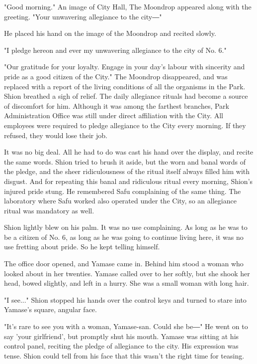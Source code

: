 "Good morning." An image of City Hall, The Moondrop appeared along with
the greeting. "Your unwavering allegiance to the city―"

He placed his hand on the image of the Moondrop and recited slowly.

"I pledge hereon and ever my unwavering allegiance to the city of No.
6."

"Our gratitude for your loyalty. Engage in your day's labour with
sincerity and pride as a good citizen of the City." The Moondrop
disappeared, and was replaced with a report of the living conditions of
all the organisms in the Park. Shion breathed a sigh of relief. The
daily allegiance rituals had become a source of discomfort for him.
Although it was among the farthest branches, Park Administration Office
was still under direct affiliation with the City. All employees were
required to pledge allegiance to the City every morning. If they
refused, they would lose their job.

It was no big deal. All he had to do was cast his hand over the display,
and recite the same words. Shion tried to brush it aside, but the worn
and banal words of the pledge, and the sheer ridiculousness of the
ritual itself always filled him with disgust. And for repeating this
banal and ridiculous ritual every morning, Shion's injured pride stung.
He remembered Safu complaining of the same thing. The laboratory where
Safu worked also operated under the City, so an allegiance ritual was
mandatory as well.

Shion lightly blew on his palm. It was no use complaining. As long as he
was to be a citizen of No. 6, as long as he was going to continue living
here, it was no use fretting about pride. So he kept telling himself.

The office door opened, and Yamase came in. Behind him stood a woman who
looked about in her twenties. Yamase called over to her softly, but she
shook her head, bowed slightly, and left in a hurry. She was a small
woman with long hair.

"I see..." Shion stopped his hands over the control keys and turned to
stare into Yamase's square, angular face.

"It's rare to see you with a woman, Yamase-san. Could she be―" He went
on to say 'your girlfriend', but promptly shut his mouth. Yamase was
sitting at his control panel, reciting the pledge of allegiance to the
city. His expression was tense. Shion could tell from his face that this
wasn't the right time for teasing.

